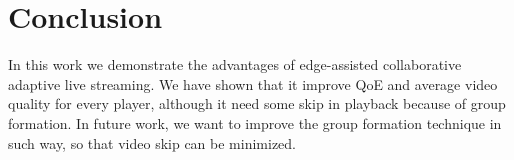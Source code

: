 \section{Conclusion}
In this work we demonstrate the advantages of edge-assisted collaborative adaptive live streaming. We have shown that it improve QoE and average video quality for every player, although it need some skip in playback because of group formation. In future work, we want to improve the group formation technique in such way, so that video skip can be minimized.